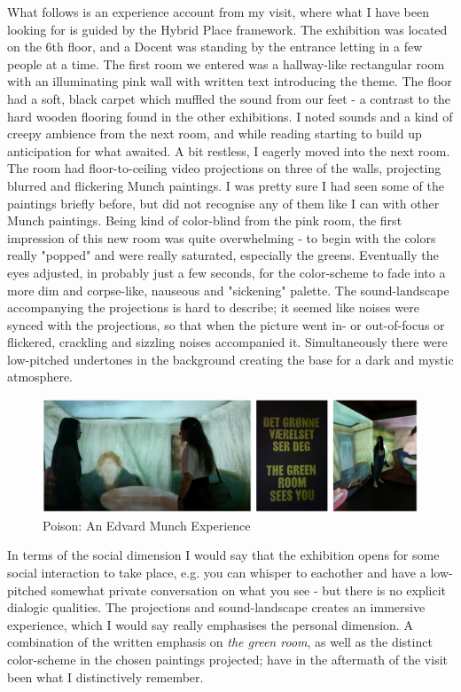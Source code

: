What follows is an experience account from my visit, where what I have been looking for is guided by the Hybrid Place framework. The exhibition was located on the 6th floor, and a Docent was standing by the entrance letting in a few people at a time. The first room we entered was a hallway-like rectangular room with an illuminating pink wall with written text introducing the theme. The floor had a soft, black carpet which muffled the sound from our feet - a contrast to the hard wooden flooring found in the other exhibitions. I noted sounds and a kind of creepy ambience from the next room, and while reading starting to build up anticipation for what awaited. A bit restless, I eagerly moved into the next room. The room had floor-to-ceiling video projections on three of the walls, projecting blurred and flickering Munch paintings. I was pretty sure I had seen some of the paintings briefly before, but did not recognise any of them like I can with other Munch paintings. Being kind of color-blind from the pink room, the first impression of this new room was quite overwhelming - to begin with the colors really "popped" and were really saturated, especially the greens. Eventually the eyes adjusted, in probably just a few seconds, for the color-scheme to fade into a more dim and corpse-like, nauseous and "sickening" palette. The sound-landscape accompanying the projections is hard to describe; it seemed like noises were synced with the projections, so that when the picture went in- or out-of-focus or flickered, crackling and sizzling noises accompanied it. Simultaneously there were low-pitched undertones in the background creating the base for a dark and mystic atmosphere.

\begin{figure}[H]
\includegraphics[width=12.5cm]{pictures/process/poison_seeu.png}
\caption{Poison: An Edvard Munch Experience}
\centering
\end{figure}

In terms of the social dimension I would say that the exhibition opens for some social interaction to take place, e.g. you can whisper to eachother and have a low-pitched somewhat private conversation on what you see - but there is no explicit dialogic qualities. The projections and sound-landscape creates an immersive experience, which I would say really emphasises the personal dimension. A combination of the written emphasis on \emph{the green room}, as well as the distinct color-scheme in the chosen paintings projected; have in the aftermath of the visit been what I distinctively remember. 

